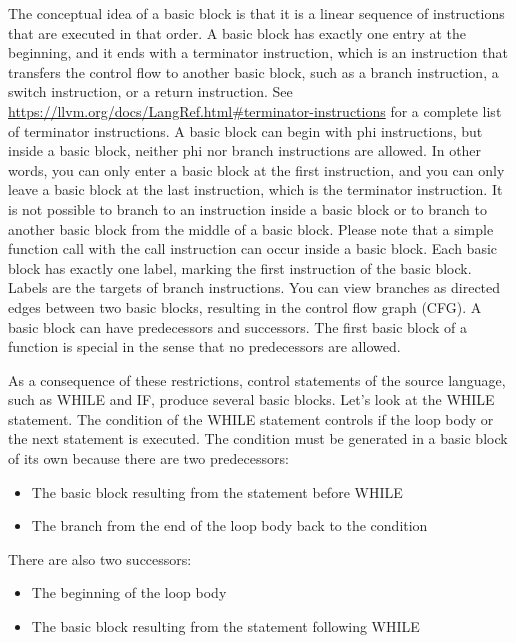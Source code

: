 The conceptual idea of a basic block is that it is a linear sequence of instructions that are executed in that order. A basic block has exactly one entry at the beginning, and it ends with a terminator instruction, which is an instruction that transfers the control flow to another basic block, such as a branch instruction, a switch instruction, or a return instruction. See \url{https://llvm.org/docs/LangRef.html#terminator-instructions} for a complete list of terminator instructions. A basic block can begin with phi instructions, but inside a basic block, neither phi nor branch instructions are allowed. In other words, you can only enter a basic block at the first instruction, and you can only leave a basic block at the last instruction, which is the terminator instruction. It is not possible to branch to an instruction inside a basic block or to branch to another basic block from the middle of a basic block. Please note that a simple function call with the call instruction can occur inside a basic block. Each basic block has exactly one label, marking the first instruction of the basic block. Labels are the targets of branch instructions. You can view branches as directed edges between two basic blocks, resulting in the control flow graph (CFG). A basic block can have predecessors and successors. The first basic block of a function is special in the sense that no predecessors are allowed.

As a consequence of these restrictions, control statements of the source language, such as WHILE and IF, produce several basic blocks. Let’s look at the WHILE statement. The condition of the WHILE statement controls if the loop body or the next statement is executed. The condition must be generated in a basic block of its own because there are two predecessors:

\begin{itemize}
\item
The basic block resulting from the statement before WHILE

\item
The branch from the end of the loop body back to the condition
\end{itemize}

There are also two successors:

\begin{itemize}
\item
The beginning of the loop body

\item
The basic block resulting from the statement following WHILE
\end{itemize}

